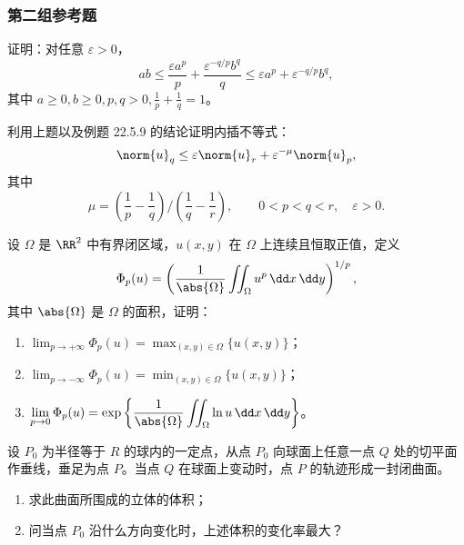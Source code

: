 \subsubsection*{第二组参考题}

\begin{xreferenceproblem}[1]
证明：对任意 $\varepsilon>0$，
  \[
    ab\le\frac{\varepsilon a^p}{p}+\frac{\varepsilon^{-q/p}b^q}{q}
    \le\varepsilon a^p+\varepsilon^{-q/p}b^q,
  \]
  其中 $a\ge0,b\ge0,p,q>0,\frac1p+\frac1q=1$。
\end{xreferenceproblem}

\begin{xreferenceproblem}[2]
利用上题以及例题 22.5.9 的结论证明内插不等式：
  \[
    \norm{u}_q\le\varepsilon\norm{u}_r+\varepsilon^{-\mu}\norm{u}_p,
  \]
  其中
  \[
    \mu=\left(\frac1p-\frac1q\right)\bigg/\left(\frac1q-\frac1r\right),
    \qquad0<p<q<r,\quad\varepsilon>0.
  \]
\end{xreferenceproblem}

\begin{xreferenceproblem}[3]
设 $\Omega$ 是 $\RR^2$ 中有界闭区域，$u(x,y)$ 在 $\Omega$ 上连续且恒取正值，定义
  \[
    \Phi_p(u)=\left(\frac1{\abs{\Omega}}\iint_\Omega u^p\,\dd x\,\dd y\right)^{1/p},
  \]
  其中 $\abs{\Omega}$ 是 $\Omega$ 的面积，证明：
  \begin{enumerate}[label=(\arabic*)]
    \item $\displaystyle\lim_{p\to+\infty}\Phi_p(u)=\max_{(x,y)\in\Omega}\{u(x,y)\}$；
    \item $\displaystyle\lim_{p\to-\infty}\Phi_p(u)=\min_{(x,y)\in\Omega}\{u(x,y)\}$；
    \item $\displaystyle\lim_{p\to0}\Phi_p(u)=\exp\left\{\frac1{\abs{\Omega}}\iint_\Omega\ln u\,\dd x\,\dd y\right\}$。
  \end{enumerate}
\end{xreferenceproblem}

\begin{xreferenceproblem}[4]
设 $P_0$ 为半径等于 $R$ 的球内的一定点，从点 $P_0$ 向球面上任意一点 $Q$ 处的切平面作垂线，垂足为点 $P$。当点 $Q$ 在球面上变动时，点 $P$ 的轨迹形成一封闭曲面。
  \begin{enumerate}[label=(\arabic*)]
    \item 求此曲面所围成的立体的体积；
    \item 问当点 $P_0$ 沿什么方向变化时，上述体积的变化率最大？
  \end{enumerate}
\end{xreferenceproblem}

